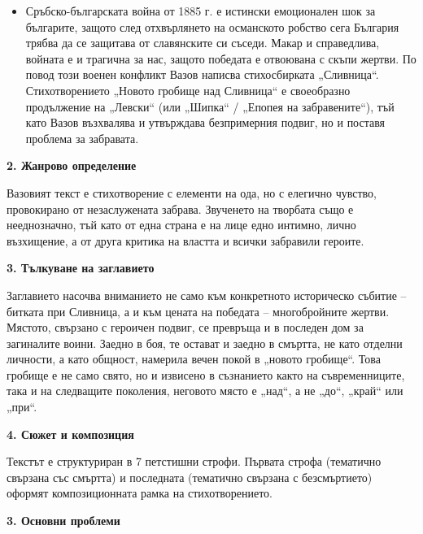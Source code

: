 \documentclass[12pt,a4paper]{article}
\begin{document}
\vspace{0.1cm}
\begin{itemize}[leftmargin=*, noitemsep, topsep=2pt, parsep=0pt]
    \item Сръбско-българската война от 1885 г. е истински емоционален шок за българите, защото след отхвърлянето на османското робство сега България трябва да се защитава от славянските си съседи. Макар и справедлива, войната е и трагична за нас, защото победата е отвоювана с скъпи жертви. По повод този военен конфликт Вазов написва стихосбирката „Сливница“. Стихотворението „Новото гробище над Сливница“ е своеобразно продължение на „Левски“ (или „Шипка“ / „Епопея на забравените“), тъй като Вазов възхвалява и утвърждава безпримерния подвиг, но и поставя проблема за забравата.
\end{itemize}

\vspace{0.1cm}
\textbf{2. Жанрово определение} 
\vspace{0.1cm}

\indent Вазовият текст е стихотворение с елементи на ода, но с елегично чувство, провокирано от незаслужената забрава. Звученето на творбата също е нееднозначно, тъй като от една страна е на лице едно интимно, лично възхищение, а от друга критика на властта и всички забравили героите.

\vspace{0.1cm}
\textbf{3. Тълкуване на заглавието}

\indent Заглавието насочва вниманието не само към конкретното историческо събитие – битката при Сливница, а и към цената на победата – многобройните жертви. Мястото, свързано с героичен подвиг, се превръща и в последен дом за загиналите воини. Заедно в боя, те остават и заедно в смъртта, не като отделни личности, а като общност, намерила вечен покой в „новото гробище“. Това гробище е не само свято, но и извисено в съзнанието както на съвременниците, така и на следващите поколения, неговото място е „над“, а не „до“, „край“ или „при“.

\vspace{0.1cm}
\textbf{4. Сюжет и композиция}
\vspace{0.1cm}

\indent Текстът е структуриран в 7 петстишни строфи. Първата строфа (тематично свързана със смъртта) и последната (тематично свързана с безсмъртието) оформят композиционната рамка на стихотворението.

\vspace{0.1cm}
\textbf{3. Основни проблеми}
\vspace{0.1cm}
\end{document}
